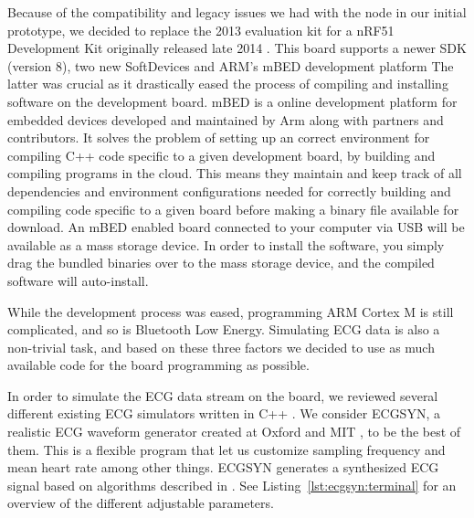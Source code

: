 Because of the compatibility and legacy issues we had with the node in our initial prototype, we decided to replace the 2013 evaluation kit for a nRF51 Development Kit originally released late 2014 \cite{newRef:53}. This board supports a newer SDK (version 8), two new SoftDevices and ARM's mBED development platform \cite{newRef:54} The latter was crucial as it drastically eased the process of compiling and installing software on the development board. mBED is a online development platform for embedded devices developed and maintained by Arm \cite{newRef:55} along with partners and contributors. It solves the problem of setting up an correct environment for compiling C++ code specific to a given development board, by building and compiling programs in the cloud. This means they maintain and keep track of all dependencies and environment configurations needed for correctly building and compiling code specific to a given board before making a binary file available for download. An mBED enabled board connected to your computer via USB will be available as a mass storage device. In order to install the software, you simply drag the bundled binaries over to the mass storage device, and the compiled software will auto-install. 

While the development process was eased, programming ARM Cortex M is still complicated, and so is Bluetooth Low Energy. Simulating ECG data is also a non-trivial task, and based on these three factors we decided to use as much available code for the board programming as possible.

In order to simulate the ECG data stream on the board, we reviewed several different existing ECG simulators written in C++ \cite{newRef:56, newRef:56:1, newRef:56:2}. We consider ECGSYN, a realistic ECG waveform generator created at Oxford and MIT \cite{newRef:56:2}, to be the best of them. This is a flexible program that let us customize sampling frequency and mean heart rate among other things. ECGSYN generates a synthesized ECG signal based on algorithms described in \cite{newRef:58}. See Listing~\ref{lst:ecgsyn:terminal} for an overview of the different adjustable parameters.

